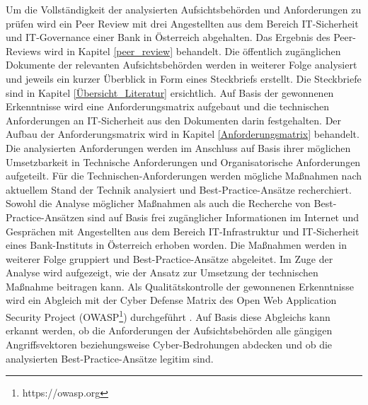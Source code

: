 Um die Vollständigkeit der analysierten Aufsichtsbehörden und Anforderungen zu prüfen wird ein Peer Review mit drei Angestellten aus dem Bereich IT-Sicherheit und IT-Governance einer Bank in Österreich abgehalten. Das Ergebnis des Peer-Reviews wird in Kapitel \ref{peer_review} behandelt. 
\bigbreak
Die öffentlich zugänglichen Dokumente der relevanten Aufsichtsbehörden werden in weiterer Folge analysiert und jeweils ein kurzer Überblick in Form eines Steckbriefs erstellt. Die Steckbriefe sind in Kapitel \ref{Übersicht_Literatur} ersichtlich. Auf Basis der gewonnenen Erkenntnisse wird eine Anforderungsmatrix aufgebaut und die technischen Anforderungen an IT-Sicherheit aus den Dokumenten darin festgehalten. Der Aufbau der Anforderungsmatrix wird in Kapitel \ref{Anforderungsmatrix} behandelt. 
Die analysierten Anforderungen werden im Anschluss auf Basis ihrer möglichen Umsetzbarkeit in \glqq{}Technische Anforderungen\grqq{} und \glqq{}Organisatorische Anforderungen\grqq{} aufgeteilt.
Für die Technischen-Anforderungen werden mögliche Maßnahmen nach aktuellem Stand der Technik analysiert und Best-Practice-Ansätze recherchiert. Sowohl die Analyse möglicher Maßnahmen als auch die Recherche von Best-Practice-Ansätzen sind auf Basis frei zugänglicher Informationen im Internet und Gesprächen mit Angestellten aus dem Bereich IT-Infrastruktur und IT-Sicherheit eines Bank-Instituts in Österreich erhoben worden. Die Maßnahmen werden in weiterer Folge gruppiert und Best-Practice-Ansätze abgeleitet. Im Zuge der Analyse wird aufgezeigt, wie der Ansatz zur Umsetzung der technischen Maßnahme beitragen kann. Als Qualitätskontrolle der gewonnenen Erkenntnisse wird ein Abgleich mit der \glqq{}Cyber Defense Matrix\grqq{} des \glqq{}Open Web Application Security Project\grqq{} (OWASP\footnote{https://owasp.org}) durchgeführt \autocite{owasp_cyber_defense_matrix}. Auf Basis diese Abgleichs kann erkannt werden, ob die Anforderungen der Aufsichtsbehörden alle gängigen Angriffsvektoren beziehungsweise Cyber-Bedrohungen abdecken und ob die analysierten Best-Practice-Ansätze legitim sind. 

